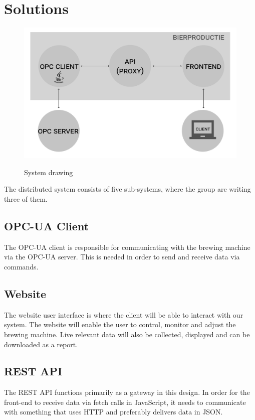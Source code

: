 \section{Solutions}
\begin{figure}[h]
\centering 
\includegraphics[scale=0.3]{images/system_drawing.pdf}
\label{figure:System_drawing}
\caption{System drawing} 
\end{figure}

The distributed system consists of five sub-systems, where the group are writing three
of them.

\subsection{OPC-UA Client}
The OPC-UA client is responsible for communicating with the brewing machine via
the OPC-UA server. This is needed in order to send and receive data via
commands.

\subsection{Website}
The website user interface is where the client will be able to interact with
our system. The website will enable the user to control, monitor and adjust
the brewing machine. Live relevant data will also be collected, displayed and
can be downloaded as a report.


\subsection{REST API}
The REST API functions primarily as a gateway in this design. In order for the
front-end to receive data via fetch calls in JavaScript, it needs to communicate 
with something that uses HTTP and preferably delivers data in JSON.

